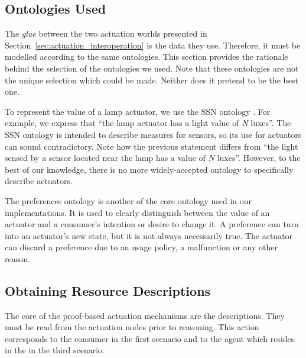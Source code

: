 \subsection{Ontologies Used}

The \emph{glue} between the two actuation worlds presented in Section~\ref{sec:actuation_interoperation} is the data they use. %
Therefore, it must be modelled according to the same ontologies.
This section provides the rationale behind the selection of the ontologies we used.
Note that these ontologies are not the unique selection which could be made.
Neither does it pretend to be the best one.


To represent the value of a lamp actuator, we use the SSN ontology .
For example, we express that ``the lamp actuator has a light value of \emph{N} luxes''.
The SSN ontology is intended to describe measures for sensors, so its use for actuators can sound contradictory.
Note how the previous statement differs from ``the light sensed by a sensor located near the lamp has a value of \emph{N} luxes''.
However, to the best of our knowledge, there is no more widely-accepted ontology to specifically describe actuators.


The preferences ontology is another of the core ontology used in our implementations.
It is used to clearly distinguish between the value of an actuator and a consumer's intention or desire to change it.
A preference can turn into an actuator's new state, but it is not always necessarily true.
The actuator can discard a preference due to an usage policy, a malfunction or any other reason.




\subsection{Obtaining Resource Descriptions}

The core of the proof-based actuation mechanisms are the descriptions.
They must be read from the actuation nodes prior to reasoning. %
This action corresponds to the consumer in the first scenario and to the agent which resides in the \Space{} in the third scenario.

